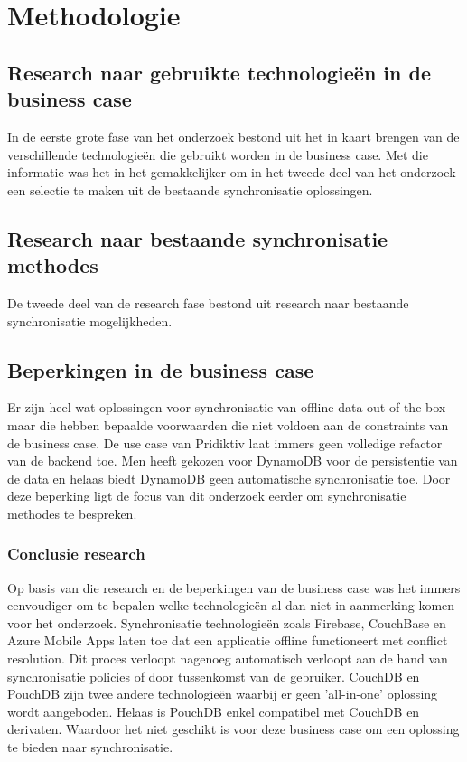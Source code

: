 
\chapter{Methodologie}
\label{ch:methodologie}


\section{Research naar gebruikte technologie\"en in de business case}
In de eerste grote fase van het onderzoek bestond uit het in kaart brengen van de verschillende technologie\"en die gebruikt worden in de business case. Met die informatie was het in het gemakkelijker om in het tweede deel van het onderzoek een selectie te maken uit de bestaande synchronisatie oplossingen.
\section{Research naar bestaande synchronisatie methodes}
De tweede deel van de research fase bestond uit research naar bestaande synchronisatie mogelijkheden.
\section{Beperkingen in de business case}
\label{sec:beperkingen-business-case}
Er zijn heel wat oplossingen voor synchronisatie van offline data out-of-the-box maar die hebben bepaalde voorwaarden die niet voldoen aan de constraints van de business case. De use case van Pridiktiv laat immers geen volledige refactor van de backend toe. Men heeft gekozen voor DynamoDB voor de persistentie van de data en helaas biedt DynamoDB geen automatische synchronisatie toe. Door deze beperking ligt de focus van dit onderzoek eerder om synchronisatie methodes te bespreken.
\subsection{Conclusie research}
 Op basis van die research en de beperkingen van de business case was het immers eenvoudiger om te bepalen welke technologie\"en al dan niet in aanmerking komen voor het onderzoek. Synchronisatie technologie\"en zoals Firebase, CouchBase en Azure Mobile Apps laten toe dat een applicatie offline functioneert met conflict resolution. Dit proces verloopt nagenoeg automatisch verloopt aan de hand van synchronisatie policies of door tussenkomst van de gebruiker. CouchDB en PouchDB zijn twee andere technologie\"en waarbij er geen 'all-in-one' oplossing wordt aangeboden. Helaas is PouchDB enkel compatibel met CouchDB en derivaten. Waardoor het niet geschikt is voor deze business case om een oplossing te bieden naar synchronisatie.
 
